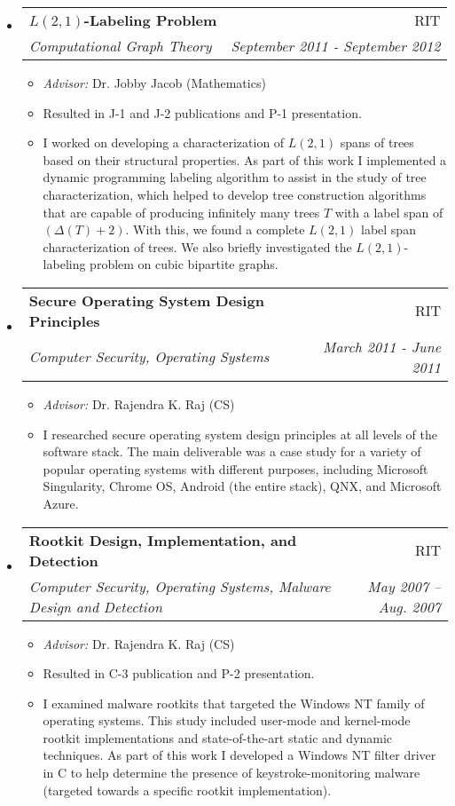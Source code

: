 \documentclass[letterpaper,11pt]{article}
\makeatletter
\newcommand{\resitem}[1]{\item #1 \vspace{-2pt}}
\newcommand{\ressubheading}[4]{
\begin{tabular*}{6.5in}[t]{l@{\cftdotfill{\cftsecdotsep}\extracolsep{\fill}}r}
		\textbf{#1} & #2 \\
		\textit{#3} & \textit{#4} \\
\end{tabular*}\vspace{-6pt}}
\makeatother
\begin{document}
\begin{itemize}
\item
	\ressubheading{$L(2,1)$-Labeling Problem}{RIT}{Computational Graph Theory}{September 2011 - September 2012}
	\begin{itemize}
		\resitem{\emph{Advisor:} Dr. Jobby Jacob (Mathematics)}
		\resitem{Resulted in J-1 and J-2 publications and P-1 presentation.}
		\resitem{I worked on developing a characterization of $L(2,1)$ spans of trees based on their structural properties. As part of this work I implemented a dynamic programming labeling algorithm to assist in the study of tree characterization, which helped to develop tree construction algorithms that are capable of producing infinitely many trees $T$ with a label span of $(\Delta(T) + 2)$. With this, we found a complete $L(2,1)$ label span characterization of trees. We also briefly investigated the $L(2,1)$-labeling problem on cubic bipartite graphs.}
	\end{itemize}

\item
	\ressubheading{Secure Operating System Design Principles}{RIT}{Computer Security, Operating Systems}{March 2011 - June 2011}
	\begin{itemize}
		\resitem{\emph{Advisor:} Dr. Rajendra K. Raj (CS)}
		\resitem{I researched secure operating system design principles at all levels of the software stack. The main deliverable was a case study for a variety of popular operating systems with different purposes, including Microsoft Singularity, Chrome OS, Android (the entire stack), QNX, and Microsoft Azure.}
	\end{itemize}

\item
	\ressubheading{Rootkit Design, Implementation, and Detection}{RIT}{Computer Security, Operating Systems, Malware Design and Detection}{May 2007 -- Aug. 2007}
	\begin{itemize}
		\resitem{\emph{Advisor:} Dr. Rajendra K. Raj (CS)}
		\resitem{Resulted in C-3 publication and P-2 presentation.}
		\resitem{I examined malware rootkits that targeted the Windows NT family of operating systems. This study included user-mode and kernel-mode rootkit implementations and state-of-the-art static and dynamic techniques. As part of this work I developed a Windows NT filter driver in C to help determine the presence of keystroke-monitoring malware (targeted towards a specific rootkit implementation).}
	\end{itemize}

\end{itemize}
\vspace*{-16pt}
\end{document}
